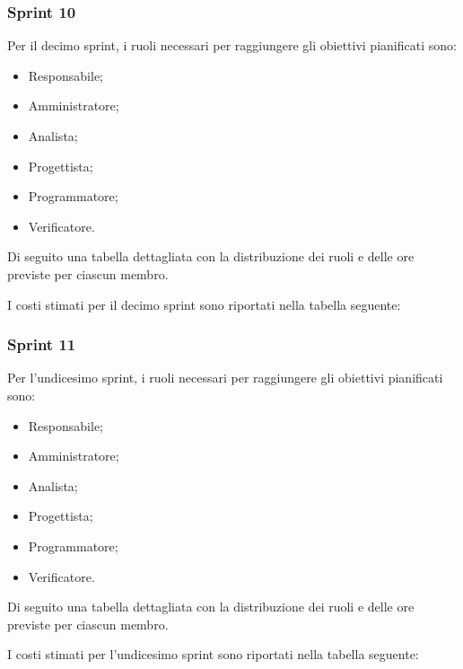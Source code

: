 

\pagebreak
\subsubsection{Sprint 10}

Per il decimo sprint, i ruoli necessari per raggiungere gli obiettivi
pianificati sono:
\begin{itemize}
    \item Responsabile;
    \item Amministratore;
    \item Analista;
    \item Progettista;
    \item Programmatore;
    \item Verificatore.
\end{itemize}

Di seguito una tabella dettagliata con la distribuzione dei ruoli e delle ore previste per ciascun membro.



I costi stimati per il decimo sprint sono riportati nella tabella seguente:



\pagebreak
\subsubsection{Sprint 11}

Per l'undicesimo sprint, i ruoli necessari per raggiungere gli obiettivi
pianificati sono:
\begin{itemize}
    \item Responsabile;
    \item Amministratore;
    \item Analista;
    \item Progettista;
    \item Programmatore;
    \item Verificatore.
\end{itemize}

Di seguito una tabella dettagliata con la distribuzione dei ruoli e delle ore previste per ciascun membro.



I costi stimati per l'undicesimo sprint sono riportati nella tabella seguente:



